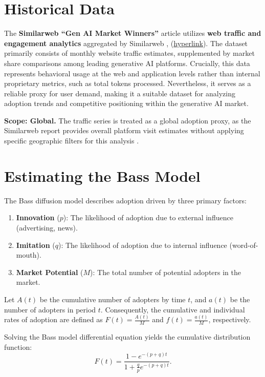 \documentclass{article}
\begin{document}
\section{Historical Data}
\label{sec:historical_data}

The \textbf{Similarweb ``Gen AI Market Winners''} article utilizes \textbf{web traffic and engagement analytics} aggregated by Similarweb \cite{similarweb2026genAIwinners}, (\href{https://www.similarweb.com/blog/insights/marketing-insights/gen-ai-market-winners/}{hyperlink}). The dataset primarily consists of monthly website traffic estimates, supplemented by market share comparisons among leading generative AI platforms. Crucially, this data represents behavioral usage at the web and application levels rather than internal proprietary metrics, such as total tokens processed. Nevertheless, it serves as a reliable proxy for user demand, making it a suitable dataset for analyzing adoption trends and competitive positioning within the generative AI market.

\noindent \textbf{Scope: Global.} The traffic series is treated as a global adoption proxy, as the Similarweb report provides overall platform visit estimates without applying specific geographic filters for this analysis \cite{similarweb2026genAIwinners}.

\section{Estimating the Bass Model}
\label{sec:bass_model}

The Bass diffusion model describes adoption driven by three primary factors:
\begin{enumerate}
    \item \textbf{Innovation} ($p$): The likelihood of adoption due to external influence (advertising, news).
    \item \textbf{Imitation} ($q$): The likelihood of adoption due to internal influence (word-of-mouth).
    \item \textbf{Market Potential} ($M$): The total number of potential adopters in the market.
\end{enumerate}

Let $A(t)$ be the cumulative number of adopters by time $t$, and $a(t)$ be the number of adopters in period $t$. Consequently, the cumulative and individual rates of adoption are defined as $F(t) = \frac{A(t)}{M}$ and $f(t) = \frac{a(t)}{M}$, respectively.

Solving the Bass model differential equation yields the cumulative distribution function:
$$
F(t) = \frac{1 - e^{-(p+q)t}}{1 + \frac{q}{p} e^{-(p+q)t}}.
$$
\end{document}

